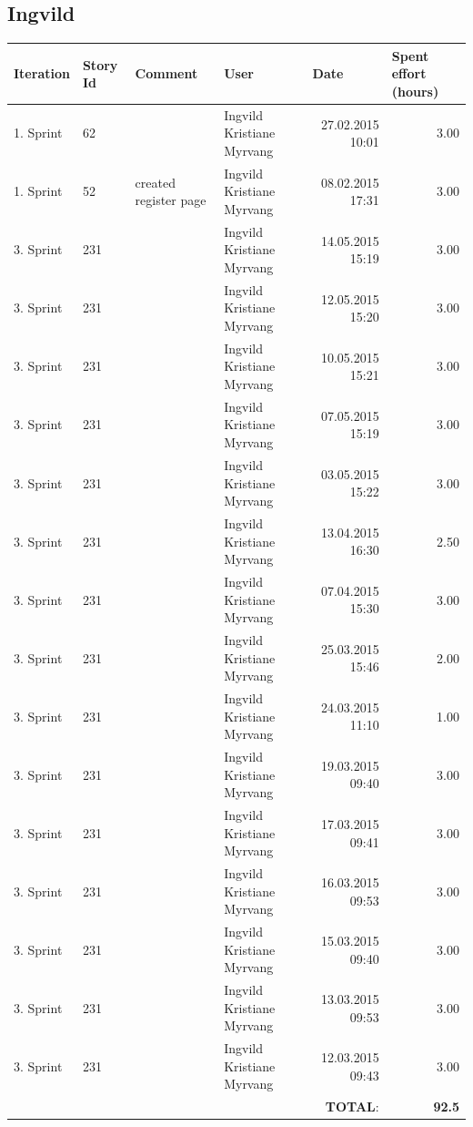 \documentclass[a4paper]{article}
\begin{document}
\begin{landscape}
\subsection{Ingvild}
\begin{tabular}{|l|l|l|l|r|r|}
\hline
\textbf{Iteration} & \textbf{Story Id} & \textbf{Comment} & \textbf{User} & \multicolumn{1}{l|}{\textbf{Date}} & \multicolumn{1}{l|}{\textbf{Spent effort (hours)}} \\ \hline
1. Sprint & 62 &  & Ingvild Kristiane Myrvang & 27.02.2015 10:01 & 3.00 \\ \hline
1. Sprint & 52 & created register page & Ingvild Kristiane Myrvang & 08.02.2015 17:31 & 3.00 \\ \hline
3. Sprint & 231 &  & Ingvild Kristiane Myrvang & 14.05.2015 15:19 & 3.00 \\ \hline
3. Sprint & 231 &  & Ingvild Kristiane Myrvang & 12.05.2015 15:20 & 3.00 \\ \hline
3. Sprint & 231 &  & Ingvild Kristiane Myrvang & 10.05.2015 15:21 & 3.00 \\ \hline
3. Sprint & 231 &  & Ingvild Kristiane Myrvang & 07.05.2015 15:19 & 3.00 \\ \hline
3. Sprint & 231 &  & Ingvild Kristiane Myrvang & 03.05.2015 15:22 & 3.00 \\ \hline
3. Sprint & 231 &  & Ingvild Kristiane Myrvang & 13.04.2015 16:30 & 2.50 \\ \hline
3. Sprint & 231 &  & Ingvild Kristiane Myrvang & 07.04.2015 15:30 & 3.00 \\ \hline
3. Sprint & 231 &  & Ingvild Kristiane Myrvang & 25.03.2015 15:46 & 2.00 \\ \hline
3. Sprint & 231 &  & Ingvild Kristiane Myrvang & 24.03.2015 11:10 & 1.00 \\ \hline
3. Sprint & 231 &  & Ingvild Kristiane Myrvang & 19.03.2015 09:40 & 3.00 \\ \hline
3. Sprint & 231 &  & Ingvild Kristiane Myrvang & 17.03.2015 09:41 & 3.00 \\ \hline
3. Sprint & 231 &  & Ingvild Kristiane Myrvang & 16.03.2015 09:53 & 3.00 \\ \hline
3. Sprint & 231 &  & Ingvild Kristiane Myrvang & 15.03.2015 09:40 & 3.00 \\ \hline
3. Sprint & 231 &  & Ingvild Kristiane Myrvang & 13.03.2015 09:53 & 3.00 \\ \hline
3. Sprint & 231 &  & Ingvild Kristiane Myrvang & 12.03.2015 09:43 & 3.00 \\ \hline
 & & & &\textbf{TOTAL}: & \textbf{92.5} \\ \hline
\end{tabular}


\end{landscape}
\end{document}
